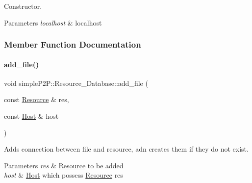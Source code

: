 Constructor. 


\begin{DoxyParams}{Parameters}
{\em localhost} & localhost \\
\hline
\end{DoxyParams}


\subsubsection{Member Function Documentation}
\mbox{\label{classsimpleP2P_1_1Resource__Database_a7afdd297b15fb225b61f9d52e2ab9cc6}} 
\paragraph{\texorpdfstring{add\+\_\+file()}{add\_file()}\hspace{0.1cm}{\footnotesize\ttfamily [1/2]}}
{\footnotesize\ttfamily void simple\+P2\+P\+::\+Resource\+\_\+\+Database\+::add\+\_\+file (\begin{DoxyParamCaption}\item[{const \hyperlink{classsimpleP2P_1_1Resource}{Resource} \&}]{res,  }\item[{const \hyperlink{classsimpleP2P_1_1Host}{Host} \&}]{host }\end{DoxyParamCaption})}



Adds connection between file and resource, adn creates them if they do not exist. 


\begin{DoxyParams}{Parameters}
{\em res} & \hyperlink{classsimpleP2P_1_1Resource}{Resource} to be added \\
\hline
{\em host} & \hyperlink{classsimpleP2P_1_1Host}{Host} which possess \hyperlink{classsimpleP2P_1_1Resource}{Resource} res \\
\hline
\end{DoxyParams}
\mbox{\label{classsimpleP2P_1_1Resource__Database_a8ac7f42f7de6f3281974d2be7f1ea8e8}} 
